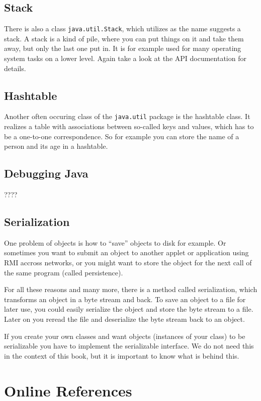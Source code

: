 \subsection{Stack}
There is also a class \verb|java.util.Stack|, which utilizes as the
name suggests a stack. A stack is a kind of pile, where you can put
things on it and take them away, but only the last one put in. It is
for example used for many operating system tasks on a lower level.
Again take a look at the API documentation for details.

\subsection{Hashtable}
Another often occuring class of the \verb|java.util| package is the
hashtable class. It realizes a table with associations between so-called
keys and values, which has to be a one-to-one correspondence. So for
example you can store the name of a person and its age in a hashtable.


\subsection{Debugging Java}
????

\subsection{Serialization}
One problem of objects is how to ``save'' objects to disk for example.
Or sometimes you want to submit an object to another applet or
application using RMI accross networks, or you might want to
store the object for the next call of the same program (called 
persistence). 

For all
these reasons and many more, there is a method called serialization,
which transforms an object in a byte stream and back. 
To save an object to a file for later use, you could easily serialize
the object and store the byte stream to a file. Later on you reread
the file and deserialize the byte stream back to an object. 

If you create your own classes and want objects (instances of your 
class) to be serializable you have to implement the serializable interface.
We do not need this in the context of this book, but it is
important to know what is behind this.  



\section{Online References}
\label{sec:OnlineReferences}

